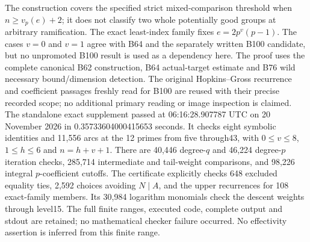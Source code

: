 \begin{remark}
\label{rem:B-RD101-scope}
The construction covers the specified strict mixed-comparison
threshold when $n\ge v_p(e)+2$; it does not classify
two whole potentially good groups at arbitrary ramification.
The exact least-index family fixes $e=2p^v(p-1)$.
The cases $v=0$ and $v=1$ agree with B64 and the
separately written B100 candidate, but no unpromoted
B100 result is used as a dependency here.
The proof uses the complete canonical B62 construction,
B64 actual-target estimate and B76 wild necessary
bound/dimension detection.
The original Hopkins--Gross recurrence and coefficient
passages freshly read for B100 are reused with their
precise recorded scope; no additional primary reading
or image inspection is claimed.
The standalone exact supplement
passed at 06:16:28.907787 UTC on 20 November 2026 in
0.35733604000415653 seconds. It checks eight symbolic
identities and 11,556 arcs at the 12 primes from five
through43, with $0\le v\le8$, $1\le h\le6$ and
$n=h+v+1$. There are 40,446 degree-$q$ and 46,224
degree-$p$ iteration checks, 285,714 intermediate
and tail-weight comparisons, and 98,226 integral
$p$-coefficient cutoffs. The certificate explicitly
checks 648 excluded equality ties, 2,592 choices
avoiding $N\mid A$, and the upper recurrences for
108 exact-family members. Its 30,984 logarithm
monomials check the descent weights through level15.
The full finite ranges, executed code, complete output
and stdout are retained; no mathematical checker
failure occurred. No effectivity assertion is inferred
from this finite range.
\end{remark}
